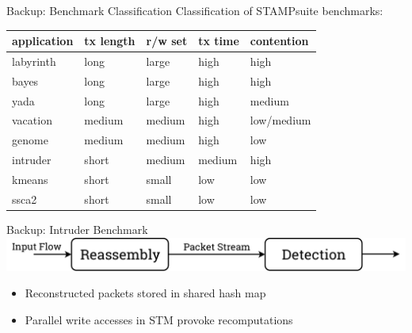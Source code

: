 \documentclass[aspectratio=169, usenames, dvipsnames]{beamer}
\begin{document}
\begin{frame}{Backup: Benchmark Classification}
  Classification of STAMP\footnotemark[2] suite benchmarks:

  \begin{center}
    \small
    \begin{tabular}{|l|l|l|l|l|}
      \hline
      \textbf{application} & \textbf{tx length} & \textbf{r/w set} & \textbf{tx time} & \textbf{contention}\\ \hline
      labyrinth & long & large & high & high\\ \hline
bayes & long & large & high & high\\ \hline
yada & long & large & high & medium\\ \hline
vacation & medium & medium & high & low/medium\\ \hline
genome & medium & medium & high & low\\ \hline
intruder & short & medium & medium & high\\ \hline
kmeans & short & small & low & low\\ \hline
ssca2 & short & small & low & low\\ \hline
    \end{tabular}
  \end{center}

\end{frame}

\begin{frame}{Backup: Intruder Benchmark}
  \centering
  \includegraphics[width=.9\textwidth,keepaspectratio]{img/intruder-flow.pdf}
  \vspace{1cm}

  \begin{itemize}
    \item<2-> Reconstructed packets stored in shared hash map
    \item<3-> Parallel write accesses in STM provoke recomputations
  \end{itemize}
\end{frame}
\end{document}
